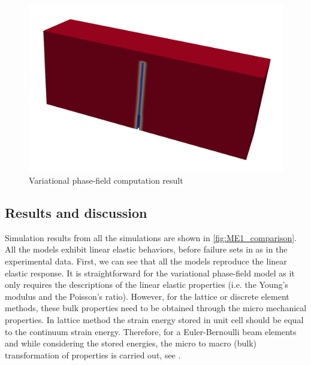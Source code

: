 \begin{figure}[!ht]
\centering
\includegraphics[width=1\textwidth]{figures/VPF_ME1_frac.png}
\caption{Variational phase-field computation result}
\label{fig:ME1_TPB_VPF_result}
\end{figure}

\subsection{Results and discussion}
Simulation results from all the simulations are shown in \ref{fig:ME1_comparison}. 
All the models exhibit linear elastic behaviors, before failure sets in as in the experimental data.
First, we can see that all the models reproduce the linear elastic response.
It is straightforward for the variational phase-field model as it only requires the descriptions of the linear elastic properties (i.e. the Young's modulus and the Poisson's ratio).
However, for the lattice or discrete element methods, these bulk properties need to be obtained through the micro mechanical properties. In lattice method the strain energy stored in unit cell should be equal to the continuum strain energy. Therefore, for a Euler-Bernoulli beam elements and while considering the stored energies, the micro to macro (bulk) transformation of properties is carried out, see \cite{Ostojastarzewski2002}.

